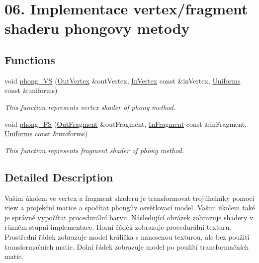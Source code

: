 \hypertarget{group__shader__side}{}\section{06. Implementace vertex/fragment shaderu phongovy metody}
\label{group__shader__side}
\subsection*{Functions}
\begin{DoxyCompactItemize}
\item 
void \hyperlink{group__shader__side_ga128e1d2afb1e73269e5a1d4eaf4c23cb}{phong\+\_\+\+VS} (\hyperlink{structOutVertex}{Out\+Vertex} \&out\+Vertex, \hyperlink{structInVertex}{In\+Vertex} const \&in\+Vertex, \hyperlink{structUniforms}{Uniforms} const \&uniforms)
\begin{DoxyCompactList}\small\item\em This function represents vertex shader of phong method. \end{DoxyCompactList}\item 
void \hyperlink{group__shader__side_gacad0f238507689fa275995e3aa67ce22}{phong\+\_\+\+FS} (\hyperlink{structOutFragment}{Out\+Fragment} \&out\+Fragment, \hyperlink{structInFragment}{In\+Fragment} const \&in\+Fragment, \hyperlink{structUniforms}{Uniforms} const \&uniforms)
\begin{DoxyCompactList}\small\item\em This function represents fragment shader of phong method. \end{DoxyCompactList}\end{DoxyCompactItemize}


\subsection{Detailed Description}
Vašim úkolem ve vertex a fragment shaderu je transformovat trojúhelníky pomocí view a projekční matice a spočítat phongův osvětlovací model. Vašim úkolem také je správně vypočítat procedurální barvu. Následující obrázek zobrazuje shadery v různém stupni implementace. Horní řáděk zobrazuje procedurální texturu. Prostřední řádek zobrazuje model králička s nanesenou texturou, ale bez použití transformačních matic. Dolní řádek zobrazuje model po použítí transformačních matic.

 

